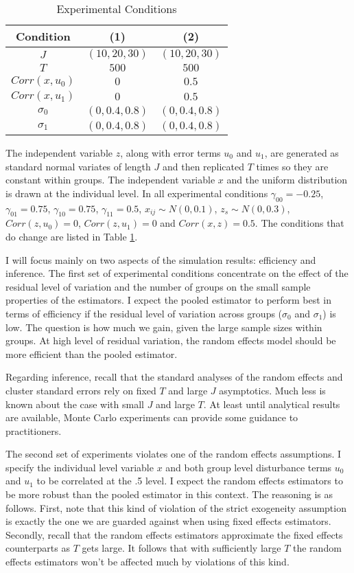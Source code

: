 \begin{table}
  \centering
  \label{table:conditions}
\begin{tabular}{ccc}
\hline
Condition & (1) & (2)  \\
\hline
$J$ & $(10,20,30)$ & $(10,20,30)$ \\
$T$ & $500$ & $500$ \\
$Corr(x,u_0)$ & $0$ & $0.5$  \\
$Corr(x,u_1)$ & $0$ & $0.5$  \\
$\sigma_0 $ & $(0,0.4,0.8)$ & $(0,0.4,0.8)$  \\
$\sigma_1$ & $(0,0.4,0.8)$ & $(0,0.4,0.8)$  \\
\hline
\end{tabular}
\caption{Experimental Conditions}
\end{table}

The independent variable $z$, along with error terms $u_0$ and $u_1$, are generated as standard normal variates of length $J$ and then replicated $T$ times so they are constant within groups.  The independent variable $x$ and the uniform distribution is drawn at the individual level. In all experimental conditions $\gamma_{00}=-0.25$, $\gamma_{01}=0.75$, $\gamma_{10}=0.75$, $\gamma_{11}=0.5$, $x_{ij}\sim N(0,0.1)$, $z_s \sim N(0,0.3)$, $Corr(z,u_0)=0$, $Corr(z,u_1)=0$ and $Corr(x,z)=0.5$. The conditions that do change are listed in Table \ref{table:conditions}.

I will focus mainly on two aspects of the simulation results: efficiency and inference. The first set of experimental conditions concentrate on the effect of the residual level of variation and the number of groups on the small sample properties of the estimators. I expect the pooled estimator to perform best in terms of efficiency if the residual level of variation across groups ($\sigma_0$ and $\sigma_1$) is low.  The question is how much we gain, given the large sample sizes within groups. At high level of residual variation, the random effects model should be more efficient than the pooled estimator.

Regarding inference, recall that the standard analyses of the random effects and cluster standard errors rely on fixed $T$ and large $J$ asymptotics. Much less is known about the case with small $J$ and large $T$.  At least until analytical results are available, Monte Carlo experiments can provide some guidance to practitioners.

The second set of experiments violates one of the random effects assumptions. I specify the individual level variable $x$ and both group level disturbance terms $u_0$ and $u_1$ to be correlated at the .5 level.  I expect the random effects estimators to be more robust than the pooled estimator in this context.  The reasoning is as follows. First, note that this kind of violation of the strict exogeneity assumption is exactly the one we are guarded against when using fixed effects estimators. Secondly, recall that the random effects estimators approximate the fixed effects counterparts as $T$ gets large. It follows that with sufficiently large $T$ the random effects estimators won't be affected much by violations of this kind.



